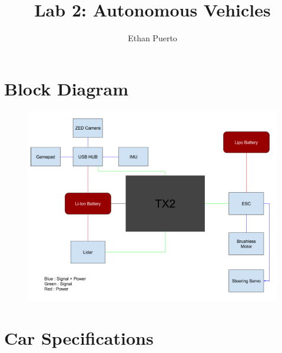 \documentclass[]{article}
\title{Lab 2: Autonomous Vehicles}
\author{Ethan Puerto}
\begin{document}
\maketitle
\newpage
\tableofcontents


\newpage
\section{Block Diagram}
\begin{figure}[h]
	\includegraphics[width=12cm]{blockdiagram}
	\centering
\end{figure}

\newpage
\section{Car Specifications}
\end{document}
